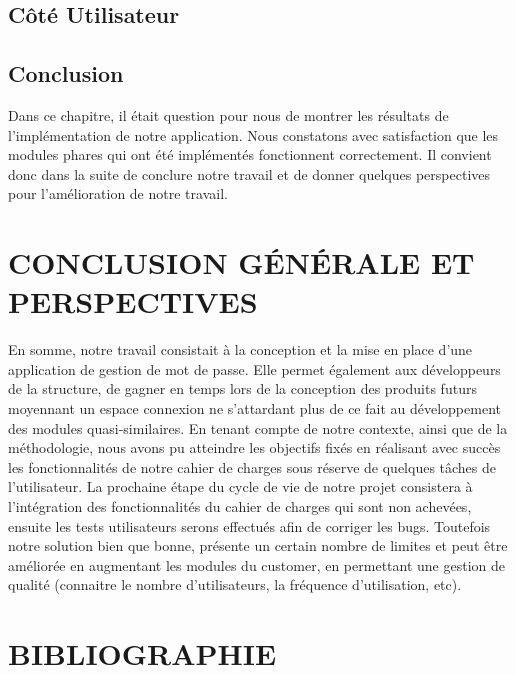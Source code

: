 \documentclass[11pt,a4paper]{report}
\begin{document}
\section{Côté Utilisateur}
\section{Conclusion}
Dans ce chapitre, il était question pour nous de montrer les résultats de l'implémentation
de notre application. Nous constatons avec satisfaction que les modules phares qui ont été
implémentés fonctionnent correctement. Il convient donc dans la suite de conclure notre travail
et de donner quelques perspectives pour l'amélioration de notre travail.
\chapter*{CONCLUSION GÉNÉRALE ET PERSPECTIVES}

En somme, notre travail consistait à la conception et la mise en place d'une application de gestion de mot de passe. Elle permet également aux développeurs de la structure, de
gagner en temps lors de la conception des produits futurs moyennant un espace connexion ne
s'attardant plus de ce fait au développement des modules quasi-similaires. En tenant compte
de notre contexte, ainsi que de la méthodologie, nous avons pu atteindre les objectifs fixés
en réalisant avec succès les fonctionnalités de notre cahier de charges sous réserve de quelques
tâches de l'utilisateur. La prochaine étape du cycle de vie de notre projet consistera à l'intégration
des fonctionnalités du cahier de charges qui sont non achevées, ensuite les tests utilisateurs
serons effectués afin de corriger les bugs. Toutefois notre solution bien que bonne, présente un
certain nombre de limites et peut être améliorée en augmentant les modules du customer, en
permettant une gestion de qualité (connaitre le nombre d'utilisateurs, la fréquence d'utilisation,
etc).

\chapter*{BIBLIOGRAPHIE}


\end{document}
